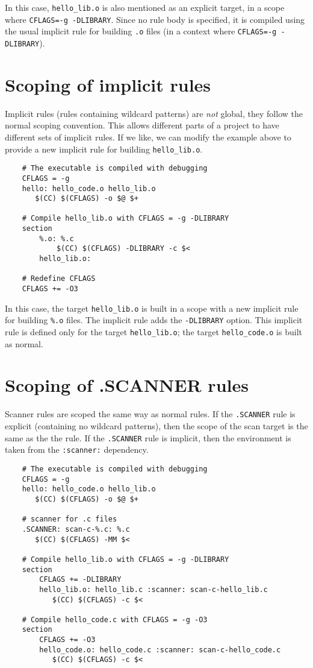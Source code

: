 In this case, \verb+hello_lib.o+ is also mentioned as an explicit target, in a scope where
\verb+CFLAGS=-g -DLIBRARY+.  Since no rule body is specified, it is compiled using the usual
implicit rule for building \verb+.o+ files (in a context where \verb+CFLAGS=-g -DLIBRARY+).

\section{Scoping of implicit rules}

Implicit rules (rules containing wildcard patterns) are \emph{not} global, they follow the normal
scoping convention.  This allows different parts of a project to have different sets of implicit
rules.  If we like, we can modify the example above to provide a new implicit rule for building
\verb+hello_lib.o+.

\begin{verbatim}
    # The executable is compiled with debugging
    CFLAGS = -g
    hello: hello_code.o hello_lib.o
       $(CC) $(CFLAGS) -o $@ $+

    # Compile hello_lib.o with CFLAGS = -g -DLIBRARY
    section
        %.o: %.c
            $(CC) $(CFLAGS) -DLIBRARY -c $<
        hello_lib.o:

    # Redefine CFLAGS
    CFLAGS += -O3
\end{verbatim}

In this case, the target \verb+hello_lib.o+ is built in a scope with a new implicit rule for
building \verb+%.o+ files.  The implicit rule adds the \verb+-DLIBRARY+ option.  This implicit rule
is defined only for the target \verb+hello_lib.o+; the target \verb+hello_code.o+ is built as
normal.

\section{Scoping of .SCANNER rules}

Scanner rules are scoped the same way as normal rules.  If the \verb+.SCANNER+ rule is explicit
(containing no wildcard patterns), then the scope of the scan target is the same as the the rule.
If the \verb+.SCANNER+ rule is implicit, then the environment is taken from the \verb+:scanner:+
dependency.

\begin{verbatim}
    # The executable is compiled with debugging
    CFLAGS = -g
    hello: hello_code.o hello_lib.o
       $(CC) $(CFLAGS) -o $@ $+

    # scanner for .c files
    .SCANNER: scan-c-%.c: %.c
       $(CC) $(CFLAGS) -MM $<

    # Compile hello_lib.o with CFLAGS = -g -DLIBRARY
    section
        CFLAGS += -DLIBRARY
        hello_lib.o: hello_lib.c :scanner: scan-c-hello_lib.c
           $(CC) $(CFLAGS) -c $<

    # Compile hello_code.c with CFLAGS = -g -O3
    section
        CFLAGS += -O3
        hello_code.o: hello_code.c :scanner: scan-c-hello_code.c
           $(CC) $(CFLAGS) -c $<
\end{verbatim}

